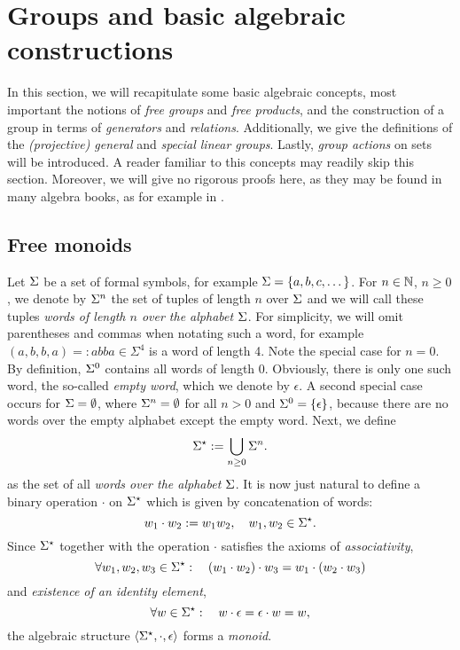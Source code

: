 \section{Groups and basic algebraic constructions}

In this section, we will recapitulate some basic algebraic concepts, most important the notions of \emph{free groups} and \emph{free products}, and the construction of a group in terms of \emph{generators} and \emph{relations}. Additionally, we give the definitions of the \emph{(projective) general} and \emph{special linear groups}. Lastly, \emph{group actions} on sets will be introduced. A reader familiar to this concepts may readily skip this section. Moreover, we will give no rigorous proofs here, as they may be found in many algebra books, as for example in \Hungerford.

\subsection{Free monoids}
Let $\Sigma$ be a set of formal symbols, for example $\Sigma = \{a, b, c, \dots\}$. For $n \in \mathbb{N}$, $n \ge 0$, we denote by $\Sigma^n$ the set of tuples of length $n$ over $\Sigma$ and we will call these tuples \emph{words of length $n$ over the alphabet $\Sigma$}. For simplicity, we will omit parentheses and commas when notating such a word, for example $(a,b,b,a) =: abba \in \Sigma^4$ is a word of length 4. Note the special case for $n = 0$. By definition, $\Sigma^0$ contains all words of length $0$. Obviously, there is only one such word, the so-called \emph{empty word}, which we denote by $\epsilon$. A second special case occurs for $\Sigma = \emptyset$, where $\Sigma^n = \emptyset$ for all $n > 0$ and $\Sigma^0 = \{\epsilon\}$, because there are no words over the empty alphabet except the empty word. Next, we define 
\begin{equation}
\label{eqn_SigmaStarDef}
{\Sigma}^{\star} := \bigcup_{n \ge 0} \Sigma^n.
\end{equation}
as the set of all \emph{words over the alphabet $\Sigma$}. It is now just natural to define a binary operation $\cdot$ on ${\Sigma}^{\star}$ which is given by concatenation of words:
\begin{equation*}
w_1 \cdot w_2 := w_1 w_2, \quad w_1, w_2 \in {\Sigma}^{\star}.
\end{equation*}
Since ${\Sigma}^{\star}$ together with the operation $\cdot$ satisfies the axioms of \emph{associativity},
\begin{equation*}
\forall w_1,w_2,w_3 \in {\Sigma}^{\star}:\quad (w_1 \cdot w_2) \cdot w_3 = w_1 \cdot (w_2 \cdot w_3)
\end{equation*}
and \emph{existence of an identity element},
\begin{equation*}
\forall w \in {\Sigma}^{\star}:\quad w \cdot  \epsilon = \epsilon \cdot w = w,
\end{equation*}
the algebraic structure $\langle {\Sigma}^{\star}, \cdot, \epsilon \rangle$ forms a \emph{monoid}.

